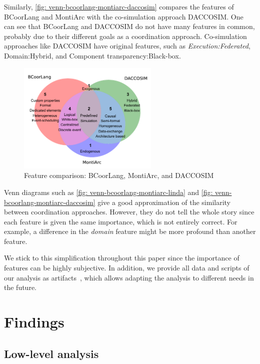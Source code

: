 \documentclass[runningheads]{llncs}
\begin{document}
Similarly, \autoref{fig: venn-bcoorlang-montiarc-daccosim} compares the features of BCoorLang and MontiArc with the co-simulation approach DACCOSIM.
One can see that BCoorLang and DACCOSIM do not have many features in common, probably due to their different goals as a coordination approach.
Co-simulation approaches like DACCOSIM have original features, such as \textit{Execution:Federated}, \textsf{Domain:Hybrid}, and \textsf{Component transparency:Black-box}.

\begin{figure}[ht]
	\centering
	\includegraphics[width=0.6\textwidth]{images/venn_bcoorlang_montiarc_daccosim}
	\caption{Feature comparison: BCoorLang, MontiArc, and DACCOSIM}
	\label{fig: venn-bcoorlang-montiarc-daccosim}
\end{figure}

Venn diagrams such as \autoref{fig: venn-bcoorlang-montiarc-linda} and \autoref{fig: venn-bcoorlang-montiarc-daccosim} give a good approximation of the similarity between coordination approaches.
However, they do not tell the whole story since each feature is given the same importance, which is not entirely correct.
For example, a difference in the \textit{domain} feature might be more profound than another feature.

We stick to this simplification throughout this paper since the importance of features can be highly subjective.
In addition, we provide all data and scripts of our analysis as artifacts~\cite{timkrauterArtifactsCoordination2024}, which allows adapting the analysis to different needs in the future.

\section{Findings} \label{sec: findings}

\subsection{Low-level analysis}
\end{document}
